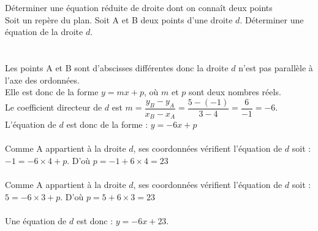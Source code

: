 \documentclass[11pt,a4paper]{article}  %
\begin{document}
	\pagestyle{empty}
	\graphicspath{{images/}}
	
	\vspace*{-2cm}
	
	\begin{center}
	\end{center}

\begin{methodeTitre}{Déterminer une équation réduite de droite dont on connaît deux points}
	\\
	Soit \Rij un repère du plan. Soit A et B deux points d'une droite $d$.
	Déterminer une équation de la droite $d$.\\
	\ \\
	\\
	Les points A et B sont d'abscisses différentes donc la droite $d$ n'est pas parallèle à l'axe des ordonnées.\\ Elle est donc de la forme $y = mx + p$, où $m$ et $p$ sont deux nombres réels.\\
	Le coefficient directeur de $d$ est $m =  \dfrac{y_B-y_A}{x_B-x_A}=\dfrac{5-(-1)}{3-4}=\dfrac{6}{-1} = -6$.\\
	L'équation de $d$ est donc de la forme : $y = -6x + p$\\
	\\
	Comme A appartient à la droite $d$, ses coordonnées vérifient l'équation de $d$ soit :\\
	$-1 = -6 \times 4 + p$. D'où  $p = -1 + 6 \times 4 = 23$\\
	\\
	Comme A appartient à la droite $d$, ses coordonnées vérifient l'équation de $d$ soit :\\
	$5 = -6 \times 3 + p$. D'où  $p = 5 + 6 \times 3 = 23$\\
	\ \\
	Une équation de $d$ est donc :  $y = - 6x + 23$.
\end{methodeTitre}
\ \\
\ \\
\ \\
	\begin{center}
\end{center}
\end{document}
